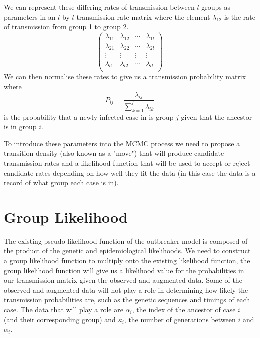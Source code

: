 \documentclass[11pt,a4paper]{report}
\begin{document}
We can represent these differing rates of transmission between $l$ groups as parameters in an $l$ by $l$ transmission rate matrix where the element $\lambda_{12}$ is the rate of transmission from group 1 to group 2.
\[ \left( \begin{array}{cccc}
\lambda_{11} & \lambda_{12} & \cdots & \lambda_{1l} \\
\lambda_{21} & \lambda_{22} & \cdots & \lambda_{2l} \\
\vdots & \vdots & \vdots & \vdots \\
\lambda_{l1} & \lambda_{l2} & \cdots & \lambda_{ll} \\
\end{array} \right) \] 
We can then normalise these rates to give us a transmission probability matrix where \[P_{ij} = \frac{\lambda_{ij}}{\sum^{l}_{k=1}\lambda_{ik}} \]
is the probability that a newly infected case in is group $j$ given that the ancestor is in group $i$.

To introduce these parameters into the MCMC process we need to propose a transition density (also known as a "move") that will produce candidate transmission rates and a likelihood function that will be used to accept or reject candidate rates depending on how well they fit the data (in this case the data is a record of what group each case is in).

\section{Group Likelihood}
The existing pseudo-likelihood function of the outbreaker model is composed of the product of the genetic and epidemiological likelihoods. We need to construct a group likelihood function to multiply onto the existing likelihood function, the group likelihood function will give us a likelihood value for the probabilities in our transmission matrix given the observed and augmented data. Some of the observed and augmented data will not play a role in determining how likely the transmission probabilities are, such as the genetic sequences and timings of each case. The data that will play a role are $\alpha_i$, the index of the ancestor of case $i$ (and their corresponding group) and $\kappa_i$, the number of generations between $i$ and $\alpha_i$.\\
\end{document}
